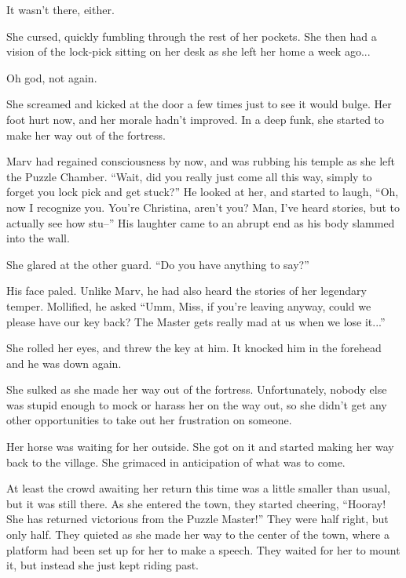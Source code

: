 \documentclass[showtrims,b6paper,draft,10pt]{memoir}
\begin{document}
It wasn’t there, either.

She cursed, quickly fumbling through the rest of her pockets.  She then had a vision of the lock-pick sitting on her desk as she left her home a week ago...

Oh god, not again.

She screamed and kicked at the door a few times just to see it would bulge.  Her foot hurt now, and her morale hadn’t improved.  In a deep funk, she started to make her way out of the fortress.

Marv had regained consciousness by now, and was rubbing his temple as she left the Puzzle Chamber.  ``Wait, did you really just come all this way, simply to forget you lock pick and get stuck?''  He looked at her, and started to laugh, ``Oh, now I recognize you.  You’re Christina, aren’t you?  Man, I’ve heard stories, but to actually see how stu--'' His laughter came to an abrupt end as his body slammed into the wall.

She glared at the other guard.  “Do you have anything to say?”

His face paled.  Unlike Marv, he had also heard the stories of her legendary temper.  Mollified, he asked  ``Umm, Miss, if you’re leaving anyway, could we please have our key back?  The Master gets really mad at us when we lose it...''

She rolled her eyes, and threw the key at him.  It knocked him in the forehead and he was down again.

\timeskip
She sulked as she made her way out of the fortress.  Unfortunately, nobody else was stupid enough to mock or harass her on the way out, so she didn’t get any other opportunities to take out her frustration on someone.

Her horse was waiting for her outside.  She got on it and started making her way back to the village.  She grimaced in anticipation of what was to come.

\timeskip

At least the crowd awaiting her return this time was a little smaller than usual, but it was still there.  As she entered the town, they started cheering, ``Hooray!  She has returned victorious from the Puzzle Master!''    They were half right, but only half.  They quieted as she made her way to the center of the town, where a platform had been set up for her to make a speech.  They waited for her to mount it, but instead she just kept riding past.
\end{document}
